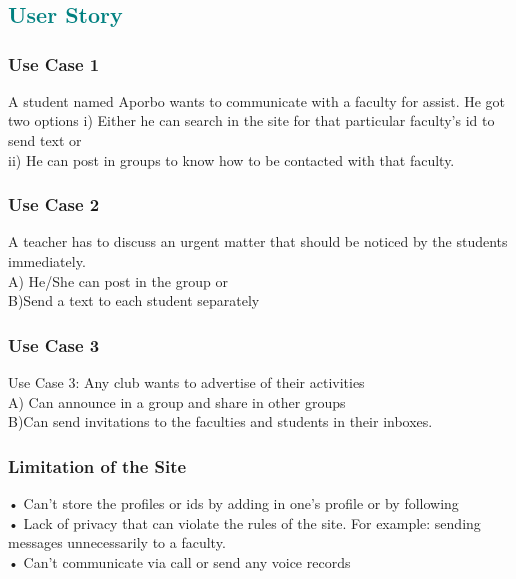 \chapter{}

{\textcolor{teal}{\section{User Story}}

\subsection{Use Case 1}
A student named Aporbo wants to communicate with a faculty for assist. He got two options 
i) Either he can search in the site for that particular faculty’s id to send text or \\
ii) He can post in groups to know how to be contacted with that faculty. \\
\subsection{Use Case 2}
A teacher has to discuss an urgent matter that should be noticed by the students immediately. \\
A) He/She can post in the group or \\
B)Send a text to each student separately\\ 
\subsection{Use Case 3}
Use Case 3:
Any club wants to advertise of their activities \\
A) Can announce in a group and share in other groups \\
B)Can send invitations to the faculties and students in their inboxes. \\

\subsection{Limitation of the Site }
• Can’t store the profiles or ids by adding in one’s profile or by following \\
• Lack of privacy that can violate the rules of the site. For example: sending messages unnecessarily to a faculty. \\
• Can’t communicate via call or send any voice records\\

}
